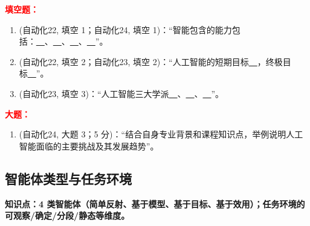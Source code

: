 ﻿\documentclass[../main.tex]{subfiles}
\begin{document}
\noindent\textbf{\textcolor{red}{填空题：}}
\begin{enumerate}[itemsep=0.3em, topsep=0.2em, leftmargin=1.5em]
    \item \textcolor{autoclassgreen}{(自动化22, 填空 1；自动化24, 填空 1)}：``智能包含的能力包括：\underline{\ \ }、\underline{\ \ }、\underline{\ \ }、\underline{\ \ }''。 
    \item \textcolor{autoclassgreen}{(自动化22, 填空 2；自动化23, 填空 2)}：``人工智能的短期目标\underline{\ \ }，终极目标\underline{\ \ }''。 
    \item \textcolor{autoclassgreen}{(自动化23, 填空 3)}：``人工智能三大学派\underline{\ \ }、\underline{\ \ }、\underline{\ \ }''。 
\end{enumerate}

\noindent\textbf{\textcolor{red}{大题：}}
\begin{enumerate}[itemsep=0.3em, topsep=0.2em, leftmargin=1.5em]
    \item \textcolor{autoclassgreen}{(自动化24, 大题 3；5 分)}：``结合自身专业背景和课程知识点，举例说明人工智能面临的主要挑战及其发展趋势''。 
\end{enumerate}

\subsection{智能体类型与任务环境}

\noindent\textbf{知识点：4 类智能体（简单反射、基于模型、基于目标、基于效用）；任务环境的可观察/确定/分段/静态等维度。}
\end{document}
